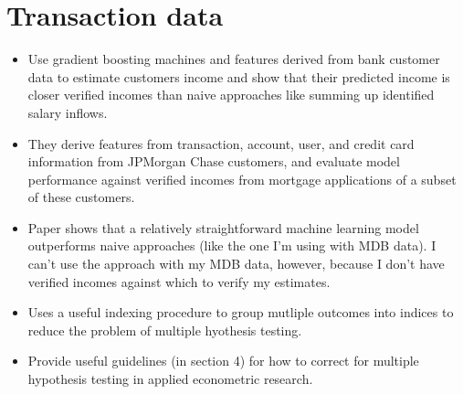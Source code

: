 
\section{Transaction data}%
\label{sec:transaction_data}


\citet{farrell2020estimating}
\begin{itemize}
    \item Use gradient boosting machines and features derived from bank
        customer data to estimate customers income and show that their
        predicted income is closer verified incomes than naive approaches like
        summing up identified salary inflows.

    \item They derive features from transaction, account, user, and credit card
        information from JPMorgan Chase customers, and evaluate model
        performance against verified incomes from mortgage applications of a
        subset of these customers.

    \item Paper shows that a relatively straightforward machine learning model
        outperforms naive approaches (like the one I'm using with MDB data). I
        can't use the approach with my MDB data, however, because I don't have
        verified incomes against which to verify my estimates.
\end{itemize}



\citet{anderson2008multiple}
\begin{itemize}
    \item Uses a useful indexing procedure to group mutliple outcomes into
        indices to reduce the problem of multiple hyothesis testing.
\end{itemize}


\citet{viviano2021should}
\begin{itemize}
    \item Provide useful guidelines (in section 4) for how to correct for multiple
        hypothesis testing in applied econometric research.
\end{itemize}

